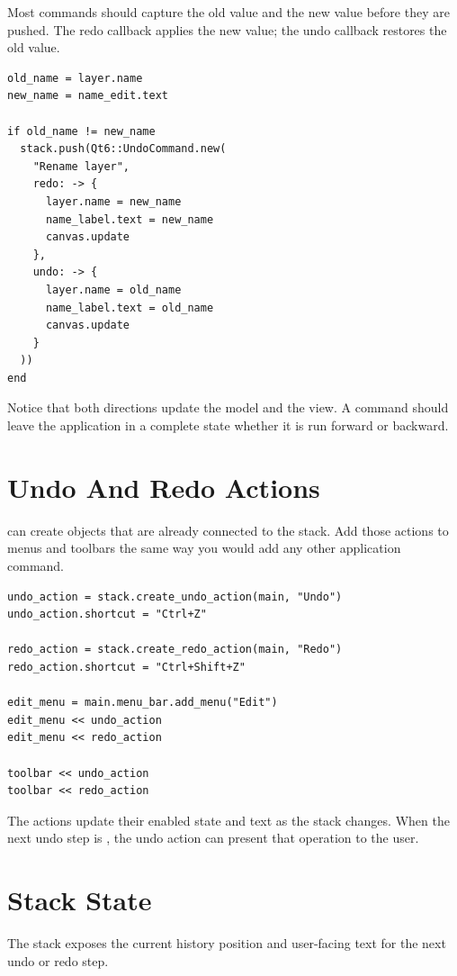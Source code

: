 Most commands should capture the old value and the new value before they are pushed. The redo callback applies the new value; the undo callback restores the old value.

\begin{lstlisting}[style=crystal]
old_name = layer.name
new_name = name_edit.text

if old_name != new_name
  stack.push(Qt6::UndoCommand.new(
    "Rename layer",
    redo: -> {
      layer.name = new_name
      name_label.text = new_name
      canvas.update
    },
    undo: -> {
      layer.name = old_name
      name_label.text = old_name
      canvas.update
    }
  ))
end
\end{lstlisting}

Notice that both directions update the model and the view. A command should leave the application in a complete state whether it is run forward or backward.

\section{Undo And Redo Actions}

 can create  objects that are already connected to the stack. Add those actions to menus and toolbars the same way you would add any other application command.

\begin{lstlisting}[style=crystal]
undo_action = stack.create_undo_action(main, "Undo")
undo_action.shortcut = "Ctrl+Z"

redo_action = stack.create_redo_action(main, "Redo")
redo_action.shortcut = "Ctrl+Shift+Z"

edit_menu = main.menu_bar.add_menu("Edit")
edit_menu << undo_action
edit_menu << redo_action

toolbar << undo_action
toolbar << redo_action
\end{lstlisting}

The actions update their enabled state and text as the stack changes. When the next undo step is , the undo action can present that operation to the user.

\section{Stack State}

The stack exposes the current history position and user-facing text for the next undo or redo step.

